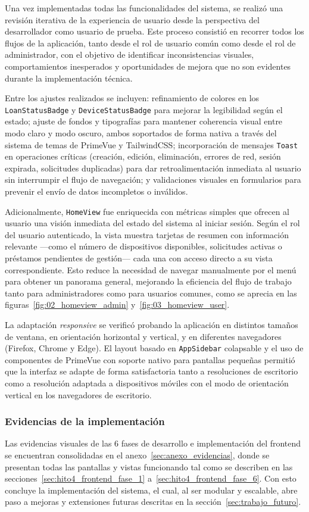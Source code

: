 Una vez implementadas todas las funcionalidades del sistema, se realizó una revisión 
iterativa de la experiencia de usuario desde la perspectiva del desarrollador como 
usuario de prueba. Este proceso consistió en recorrer todos los flujos de la 
aplicación, tanto desde el rol de usuario común como desde el rol de administrador, 
con el objetivo de identificar inconsistencias visuales, comportamientos inesperados 
y oportunidades de mejora que no son evidentes durante la implementación técnica.

Entre los ajustes realizados se incluyen: refinamiento de colores en los 
\texttt{LoanStatusBadge} y \texttt{DeviceStatusBadge} para mejorar la legibilidad 
según el estado; ajuste de fondos y tipografías para mantener coherencia visual entre 
modo claro y modo oscuro, ambos soportados de forma nativa a través del sistema de 
temas de PrimeVue y TailwindCSS; incorporación de mensajes \texttt{Toast} en 
operaciones críticas (creación, edición, eliminación, errores de red, sesión expirada, 
solicitudes duplicadas) para dar retroalimentación inmediata al usuario sin 
interrumpir el flujo de navegación; y validaciones visuales en formularios para 
prevenir el envío de datos incompletos o inválidos.

Adicionalmente, \texttt{HomeView} fue enriquecida con métricas simples que ofrecen 
al usuario una visión inmediata del estado del sistema al iniciar sesión. Según el 
rol del usuario autenticado, la vista muestra tarjetas de resumen con información 
relevante —como el número de dispositivos disponibles, solicitudes activas o 
préstamos pendientes de gestión— cada una con acceso directo a su vista 
correspondiente. Esto reduce la necesidad de navegar manualmente por el menú para 
obtener un panorama general, mejorando la eficiencia del flujo de trabajo tanto para 
administradores como para usuarios comunes, como se aprecia en las 
figuras~\ref{fig:02_homeview_admin} y~\ref{fig:03_homeview_user}.

La adaptación \textit{responsive} se verificó probando la aplicación en distintos 
tamaños de ventana, en orientación horizontal y vertical, y en diferentes navegadores 
(Firefox, Chrome y Edge). El layout basado en \texttt{AppSidebar} colapsable y el 
uso de componentes de PrimeVue con soporte nativo para pantallas pequeñas permitió 
que la interfaz se adapte de forma satisfactoria tanto a resoluciones de escritorio 
como a resolución adaptada a dispositivos móviles con el modo de orientación vertical 
en los navegadores de escritorio.

\subsubsection*{Evidencias de la implementación}

Las evidencias visuales de las 6 fases de desarrollo e implementación del frontend 
se encuentran consolidadas en el anexo~\ref{sec:anexo_evidencias}, donde se 
presentan todas las pantallas y vistas funcionando tal como se describen en las 
secciones~\ref{sec:hito4_frontend_fase_1} a~\ref{sec:hito4_frontend_fase_6}.
Con esto concluye la implementación del sistema, el cual, al ser modular y 
escalable, abre paso a mejoras y extensiones futuras descritas en la 
sección~\ref{sec:trabajo_futuro}.